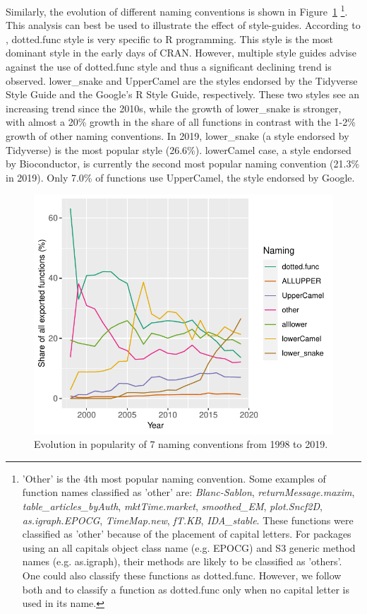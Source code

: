 Similarly, the evolution of different naming conventions is shown in Figure~\ref{figure:fig2} \footnote{'Other' is the 4th most popular naming convention. Some examples of function names classified as 'other' are: \emph{Blanc-Sablon}, \emph{returnMessage.maxim}, \emph{table\_articles\_byAuth}, \emph{mktTime.market}, \emph{smoothed\_EM}, \emph{plot.Sncf2D}, \emph{as.igraph.EPOCG}, \emph{TimeMap.new}, \emph{fT.KB}, \emph{IDA\_stable}. These functions were classified as 'other' because of the placement of capital letters. For packages using an all capitals object class name (e.g. EPOCG) and S3 generic method names (e.g. as.igraph), their methods are likely to be classified as 'others'. One could also classify these functions as dotted.func. However, we follow both  and \citet{baaaath} to classify a function as dotted.func only when no capital letter is used in its name.}. This analysis can best be used to illustrate the effect of style-guides. According to \citet{baaaath}, dotted.func style is very specific to R programming. This style is the most dominant style in the early days of CRAN. However, multiple style guides advise against the use of dotted.func style and thus a significant declining trend is observed. lower\_snake and UpperCamel are the styles endorsed by the Tidyverse Style Guide and the Google's R Style Guide, respectively. These two styles see an increasing trend since the 2010s, while the growth of lower\_snake is stronger, with almost a 20\% growth in the share of all functions in contrast with the 1-2\% growth of other naming conventions. In 2019, lower\_snake (a style endorsed by Tidyverse) is the most popular style (26.6\%). lowerCamel case, a style endorsed by Bioconductor, is currently the second most popular naming convention (21.3\% in 2019). Only 7.0\% of functions use UpperCamel, the style endorsed by Google.

\begin{figure}[htbp]
  \centering
  \includegraphics{fig2}
  \caption{Evolution in popularity of 7 naming conventions from 1998 to 2019.}
  \label{figure:fig2}
\end{figure}

